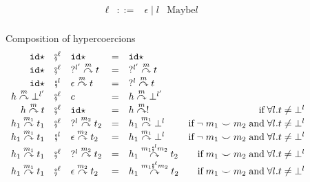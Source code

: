 \documentclass[acmsmall,review,anonymous]{acmart}\settopmatter{printfolios=true,printccs=false,printacmref=false}
\newcommand{\stxrule}[3]{#1 & ::= & #3 & \text{#2}\\}
\newcommand{\comprule}[4]{#1 & \fatsemi^\ell & #2 & = & #3 & #4 \\}
\newcommand{\comprulel}[4]{#1 & \fatsemi^l & #2 & = & #3 & #4 \\}
\newcommand{\sidecond}[1]{\text{if}\;#1}
\newcommand{\hyperCoercionI}[0]{\mathtt{id\star}}
\newcommand{\hyperCoercionC}[3]{#1 \overset{#2}{\curvearrowright} #3}
\begin{document}
\begin{figure}
	\[
	\begin{array}{rclr}
	\stxrule{\ell}{Maybe$l$}{\epsilon \mid l}
	\end{array}
	\]
	
	Composition of hypercoercions 
	\[ 
	\begin{array}{rclclr}
	
	\comprule{
		\hyperCoercionI
	}{
		\hyperCoercionI
	}{
		\hyperCoercionI
	}{}
	
	\comprule{
		\hyperCoercionI
	}{
		\hyperCoercionC{?^{l'}}{m}{t}
	}{
		\hyperCoercionC{?^{l'}}{m}{t}
	}{}
	
	\comprulel{
		\hyperCoercionI
	}{
		\hyperCoercionC{\epsilon}{m}{t}
	}{
		\hyperCoercionC{?^{l}}{m}{t}
	}{}
	
	\comprule{
		\hyperCoercionC{h}{m}{\bot^{l'}}
	}{
		c
	}{
		\hyperCoercionC{h}{m}{\bot^{l'}}
	}{}
	
	\comprule{
		\hyperCoercionC{h}{m}{t}
	}{
		\hyperCoercionI
	}{
		\hyperCoercionC{h}{m}{!}
	}{
		\sidecond{\forall l. t \neq \bot^{l}}
	}
	
	\comprule{
		\hyperCoercionC{h_1}{m_1}{t_1}
	}{
		\hyperCoercionC{?^l}{m_2}{t_2}
	}{
		\hyperCoercionC{h_1}{m_1}{\bot^l}
	}{
		\sidecond{
			\neg \; m_1 \smile m_2
			\; \text{and} \;
			\forall l. t \neq \bot^{l}
		}
	}

\comprulel{
\hyperCoercionC{h_1}{m_1}{t_1}
}{
\hyperCoercionC{\epsilon}{m_2}{t_2}
}{
\hyperCoercionC{h_1}{m_1}{\bot^l}
}{
\sidecond{
	\neg \; m_1 \smile m_2
	\; \text{and} \;
	\forall l. t \neq \bot^{l}
}
}
\comprule{
\hyperCoercionC{h_1}{m_1}{t_1}
}{
\hyperCoercionC{?^l}{m_2}{t_2}
}{
\hyperCoercionC{h_1}{m_1 \fatsemi^{l} m_2}{t_2}
}{
\sidecond{
	m_1 \smile m_2
	\; \text{and} \;
	\forall l. t \neq \bot^{l}
}
}
	\comprule{
		\hyperCoercionC{h_1}{m_1}{t_1}
	}{
		\hyperCoercionC{\epsilon}{m_2}{t_2}
	}{
		\hyperCoercionC{h_1}{m_1 \fatsemi^{\ell} m_2}{t_2}
	}{
		\sidecond{
			m_1 \smile m_2
			\; \text{and} \;
			\forall l. t \neq \bot^{l}
		}
	}
%
%	
	\end{array}
	\]
	

\end{figure}
\end{document}
